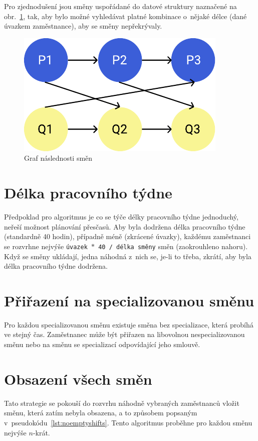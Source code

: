 \documentclass[a4paper,11pt,openany,twoside]{book}
\begin{document}
Pro zjednodušení jsou směny uspořádané do datové struktury naznačené na obr.~\ref{fig:shiftprecedence}, tak, aby bylo možné vyhledávat platné kombinace o~nějaké délce (dané úvazkem zaměstnance), aby se směny nepřekrývaly.

\begin{figure}[h!]
	\centering
	\includegraphics[scale=0.7]{img/shift-overlap-small.pdf}
	\caption{Graf následnosti směn}
	\label{fig:shiftprecedence}
\end{figure}


\section{Délka pracovního týdne}
Předpoklad pro algoritmus je co se týče délky pracovního týdne jednoduchý, neřeší možnost plánování přesčasů. Aby byla dodržena délka pracovního týdne (standardně 40 hodin), případně méně (zkrácené úvazky), každému zaměstnanci se rozvrhne nejvýše \texttt{úvazek $\ast$ 40 / délka směny} směn (zaokrouhleno nahoru). Když se směny ukládají, jedna náhodná z~nich se, je-li to třeba, zkrátí, aby byla délka pracovního týdne dodržena.

\section{Přiřazení na specializovanou směnu}

Pro každou specializovanou směnu existuje směna bez specializace, která probíhá ve stejný čas. Zaměstnanec může být přiřazen na libovolnou nespecializovanou směnu nebo na směnu se specializací odpovídající jeho smlouvě.

\section{Obsazení všech směn}
Tato strategie se pokouší do rozvrhu náhodně vybraných zaměstnanců vložit směnu, která zatím nebyla obsazena, a to způsobem popsaným v~pseudokódu~\ref{lst:noemptyshifts}. Tento algoritmus proběhne pro každou směnu nejvýše $n$-krát.
\end{document}
